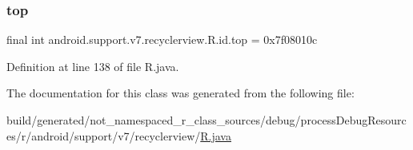 \subsubsection{\texorpdfstring{top}{top}}
{\footnotesize\ttfamily final int android.\+support.\+v7.\+recyclerview.\+R.\+id.\+top = 0x7f08010c\hspace{0.3cm}{\ttfamily [static]}}



Definition at line 138 of file R.\+java.



The documentation for this class was generated from the following file\+:\begin{DoxyCompactItemize}
\item 
build/generated/not\+\_\+namespaced\+\_\+r\+\_\+class\+\_\+sources/debug/process\+Debug\+Resources/r/android/support/v7/recyclerview/\mbox{\hyperlink{android_2support_2v7_2recyclerview_2_r_8java}{R.\+java}}\end{DoxyCompactItemize}
